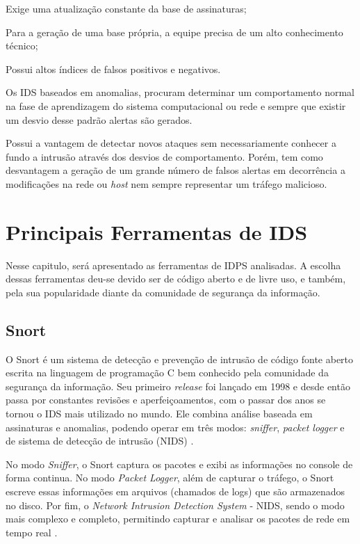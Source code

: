 \begin{alineas}
\item Exige uma atualização constante da base de assinaturas;
\item Para a geração de uma base própria, a equipe precisa de um alto conhecimento técnico;
\item Possui altos índices de falsos positivos e negativos.
\end{alineas}

Os IDS baseados em anomalias, procuram determinar um comportamento normal na fase de aprendizagem do sistema computacional ou rede e sempre que existir um desvio desse padrão alertas são gerados. 

Possui a vantagem de detectar novos ataques sem necessariamente conhecer a fundo a intrusão através dos desvios de comportamento. Porém, tem como desvantagem a geração de um grande número de falsos alertas em decorrência a modificações na rede ou \textit{host} nem sempre representar um tráfego malicioso. 

\section{Principais Ferramentas de IDS} \label{sec:idps-ferramentas}

Nesse capitulo, será apresentado as ferramentas de IDPS analisadas. A escolha dessas ferramentas deu-se devido ser de código aberto e de livre uso, e também, pela sua popularidade diante da comunidade de segurança da informação.

\subsection{Snort} \label{sec:snort}

O Snort é um sistema de detecção e prevenção de intrusão de código fonte aberto escrita na linguagem de programação C bem conhecido pela comunidade da segurança da informação. Seu primeiro \textit{release} foi lançado em 1998 e desde então passa por constantes revisões e aperfeiçoamentos, com o passar dos anos se tornou o IDS mais utilizado no mundo. Ele combina análise baseada em assinaturas e anomalias, podendo operar em três modos: \textit{sniffer}, \textit{packet logger} e de sistema de detecção de intrusão (NIDS) \cite{snort:manual}.

No modo \textit{Sniffer}, o Snort captura os pacotes e exibi as informações no console de forma continua. No modo \textit{Packet Logger}, além de capturar o tráfego, o Snort escreve essas informações em arquivos (chamados de logs) que são armazenados no disco. Por fim, o \textit{Network Intrusion Detection System} - NIDS, sendo o modo mais complexo e completo, permitindo capturar e analisar os pacotes de rede em tempo real \cite{snort:manual}.


